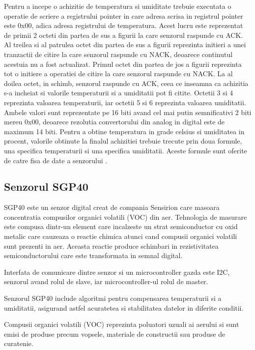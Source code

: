 Pentru a incepe o achizitie de temperatura si umiditate trebuie executata o operatie de scriere a registrului pointer in care adresa scrisa in registrul pointer este 
0x00, adica adresa registrului de temperatura. Acest lucru este reprezentat de primii 2 octeti din partea de sus a figurii la care senzorul raspunde cu ACK. Al treilea 
si al patrulea octet din partea de sus a figurii reprezinta initieri a unei tranzactii de citire la care senzorul raspunde cu NACK, deoarece continutul acestuia nu a 
fost actualizat. Primul octet din partea de jos a figurii reprezinta tot o initiere a operatiei de citire la care senzorul raspunde cu NACK. La al doilea octet, in schimb, 
senzorul raspunde cu ACK, ceea ce inseamna ca achizitia s-a incheiat si valorile temperaturii si a umiditatii pot fi citite. Octetii 3 si 4 reprezinta valoarea 
temperaturii, iar octetii 5 si 6 reprezinta valoarea umiditatii. Ambele valori sunt reprezentate pe 16 biti avand cel mai putin semnificativi 2 biti mereu 0x00, 
deoarece rezolutia convertorului din analog in digital este de maximum 14 biti. Pentru a obtine temperatura in grade celsius si umiditatea in procent, valorile 
obtinute la finalul achizitiei trebuie trecute prin doua formule, una specifica temperaturii si una specifica umiditatii. Aceste formule sunt oferite de catre 
fisa de date a senzorului \cite{hdc1080}.

\subsection{Senzorul SGP40}\label{subsec:af_sgp40}
SGP40 \cite{sgp40} este un senzor digital creat de compania Sensirion care masoara concentratia compusilor organici volatili (VOC) din aer. Tehnologia de masurare este compusa 
dintr-un element care incalzeste un strat semiconductor cu oxid metalic care cauzeaza o reactie chimica atunci cand compusii organici volatili sunt prezenti in aer. 
Aceasta reactie produce schimbari in rezistivitatea semiconductorului care este transformata in semnal digital.

Interfata de comunicare dintre senzor si un microcontroller gazda este I2C, senzorul avand rolul de slave, iar microcontroller-ul rolul de master.

Senzorul SGP40 include algoritmi pentru compensarea temperaturii si a umiditatii, asigurand astfel acuratetea si stabilitatea datelor in diferite conditii.

Compusii organici volatili (VOC) reprezinta poluatori uzuali ai aerului si sunt emisi de produse precum vopsele, materiale de constructii sau produse de curatenie.


